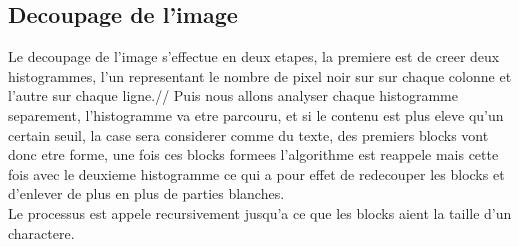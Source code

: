 \subsection{Decoupage de l'image}
Le decoupage de l'image s'effectue en deux etapes, la premiere est de creer deux histogrammes, l'un representant le nombre de pixel noir sur sur chaque colonne et l'autre sur chaque ligne.// 
Puis nous allons analyser chaque histogramme separement, l'histogramme va etre parcouru, et si le contenu est plus eleve qu'un certain seuil, la case sera considerer comme du texte, des premiers blocks vont donc etre forme, une fois ces blocks formees l'algorithme est reappele mais cette fois avec le deuxieme histogramme ce qui a pour effet de redecouper les blocks et d'enlever de plus en plus de parties blanches.\\
Le processus est appele recursivement jusqu'a ce que les blocks aient la taille d'un charactere.\\


